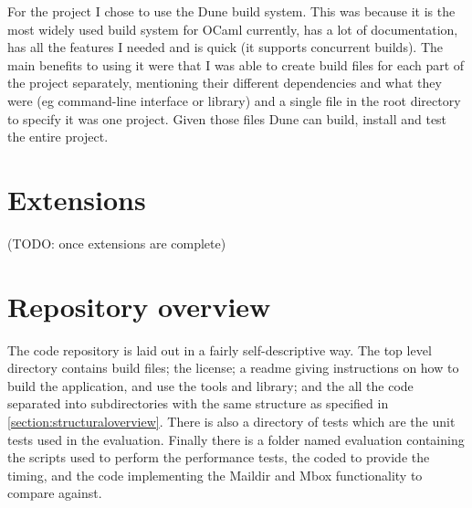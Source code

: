 For the project I chose to use the Dune\cite{code_dune} build system. This was because it is the most widely used build system for OCaml currently, has a lot of documentation, has all the features I needed and is quick (it supports concurrent builds). The main benefits to using it were that I was able to create build files for each part of the project separately, mentioning their different dependencies and what they were (eg command-line interface or library) and a single file in the root directory to specify it was one project. Given those files Dune can build, install and test the entire project.

\section{Extensions} \label{section:extensions}

(TODO: once extensions are complete)

\section{Repository overview}

The code repository is laid out in a fairly self-descriptive way. The top level directory contains build files; the license; a readme giving instructions on how to build the application, and use the tools and library; and the all the code separated into subdirectories with the same structure as specified in \ref{section:structuraloverview}. There is also a directory of tests which are the unit tests used in the evaluation. Finally there is a folder named evaluation containing the scripts used to perform the performance tests, the coded to provide the timing, and the code implementing the Maildir and Mbox functionality to compare against.
